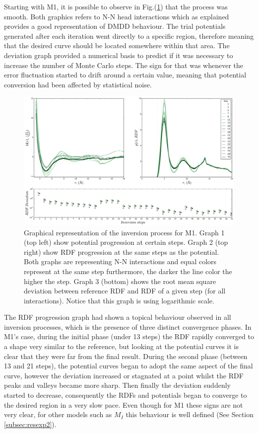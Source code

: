 \documentclass[10pt,a4paper,twoside]{article}
\begin{document}
 Starting with M1, it is possible to observe in Fig.(\ref{Fig:convM1}) that the process was smooth. Both graphics refers to N-N head interactions which as explained provides a good representation of DMDD behaviour. The trial potentials generated after each iteration went directly to a specific region, therefore meaning that the desired curve should be located somewhere within that area. The deviation graph provided a numerical basis to predict if it was necessary to increase the number of Monte Carlo steps. The sign for that was whenever the error fluctuation started to drift around a certain value, meaning that potential conversion had been affected by statistical noise.
 
\begin{figure}[ht!]
  \begin{center}
	\includegraphics[width=1 \textwidth]{./graphs/ConvLow}
	\caption{Graphical representation of the inversion process for M1. Graph 1 (top left) show potential progression at certain steps. Graph 2 (top right) show RDF progression at the same steps as the potential. Both graphs are representing N-N interactions and equal colors represent at the same step furthermore, the darker the line color the higher the step. Graph 3 (bottom) shows the root mean square deviation between reference RDF and RDF of a given step (for all interactions). Notice that this graph is using logarithmic scale.}
	\label{Fig:convM1}
  \end{center}
\end{figure} 

The RDF progression graph had shown a topical behaviour observed in all inversion processes, which is the presence of three distinct convergence phases. In M1's case, during the initial phase (under 13 steps) the RDF rapidly converged to a shape very similar to the reference, but looking at the potential curves it is clear that they were far from the final result. During the second phase (between 13 and 21 steps), the potential curves began to adopt the same aspect of the final curve, however the deviation increased or stagnated at a point whilst the RDF peaks and valleys became more sharp. Then finally the deviation suddenly started to decrease, consequently the RDFs and potentials began to converge to the desired region in a very slow pace. Even though for M1 these signs are not very clear, for other models such as $M_{I}$ this behaviour is well defined (See Section \ref{subsec:resexp2}).
\end{document}
